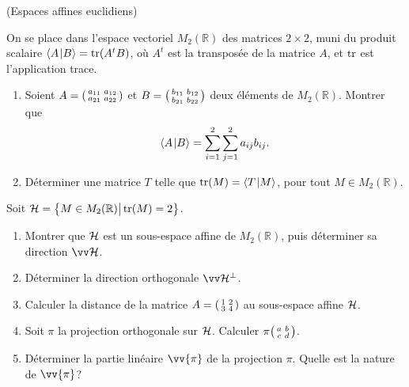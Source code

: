 \documentclass[a4paper,12pt,reqno]{amsart}
\begin{document}
\begin{exo} (Espaces affines euclidiens)

  On se place dans l'espace vectoriel $M_2(\mathbb{R})$ des matrices $2\times 2$, muni du produit scalaire $\langle{A}\kern1pt |{B}\rangle=\operatorname{tr}(A^{t}B)$, où $A^{t}$ est la transposée de la matrice $A$, et $\operatorname{tr}$ est l'application trace.
  \begin{enumerate}
    \item Soient $A=\begin{psmallmatrix} a_{11} & a_{12}\\ a_{21} & a_{22}\end{psmallmatrix}$ et $B=\begin{psmallmatrix} b_{11} & b_{12}\\ b_{21} & b_{22}\end{psmallmatrix}$ deux éléments de $M_2(\mathbb{R})$. Montrer que
    \[
      \langle{A}\kern1pt |{B}\rangle = \sum_{i=1}^{2}\sum_{j=1}^{2} a_{ij}b_{ij}.
    \]
    \item Déterminer une matrice $T$ telle que $\operatorname{tr}(M)=\langle{T}\kern1pt |{M}\rangle$, pour tout $M \in M_2(\mathbb{R})$.
    \end{enumerate}

    Soit $\mathcal{H}=\big\{ M \in M_2(\mathbb{R})\big| \operatorname{tr}(M)=2 \big\}$.

    \begin{enumerate}[resume]
    \item Montrer que $\mathcal{H}$ est un sous-espace affine de $M_2(\mathbb{R})$, puis déterminer sa direction $\ev{H}$.
    \item Déterminer la direction orthogonale $\ev{H}^{\perp}$.
    \item Calculer la distance de la matrice $A=\begin{psmallmatrix} 1 & 2\\ 3 & 4\end{psmallmatrix}$ au sous-espace affine $\mathcal{H}$.
    \item Soit $\pi$ la projection orthogonale sur $\mathcal{H}$. Calculer $\pi\begin{psmallmatrix} a & b\\ c & d\end{psmallmatrix}$.
    \item Déterminer la partie linéaire $\vv{\pi}$ de la projection $\pi$. Quelle est la nature de $\vv{\pi}$?
  \end{enumerate}

\end{exo}
\end{document}
